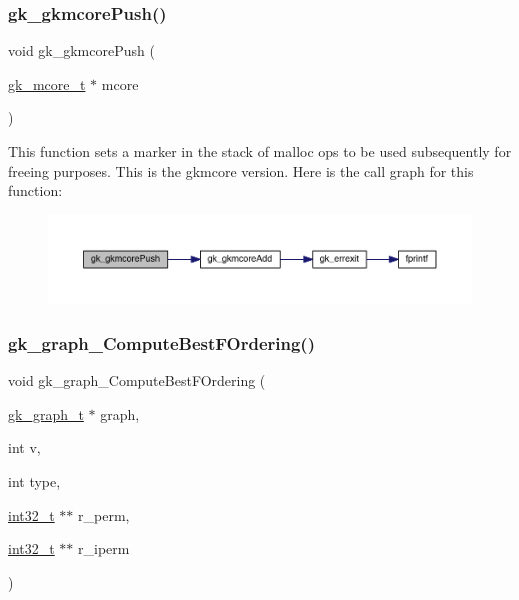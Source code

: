 \subsubsection{\texorpdfstring{gk\+\_\+gkmcore\+Push()}{gk\_gkmcorePush()}}
{\footnotesize\ttfamily void gk\+\_\+gkmcore\+Push (\begin{DoxyParamCaption}\item[{\hyperlink{a00682}{gk\+\_\+mcore\+\_\+t} $\ast$}]{mcore }\end{DoxyParamCaption})}

This function sets a marker in the stack of malloc ops to be used subsequently for freeing purposes. This is the gkmcore version. Here is the call graph for this function\+:\nopagebreak
\begin{figure}[H]
\begin{center}
\leavevmode
\includegraphics[width=350pt]{a00077_a7e52f5d61f36e5c6a9e6634d90dadf2d_cgraph}
\end{center}
\end{figure}
\mbox{\label{a00077_ab06073efcea470e57620d447548b2aca}} 
\subsubsection{\texorpdfstring{gk\+\_\+graph\+\_\+\+Compute\+Best\+F\+Ordering()}{gk\_graph\_ComputeBestFOrdering()}}
{\footnotesize\ttfamily void gk\+\_\+graph\+\_\+\+Compute\+Best\+F\+Ordering (\begin{DoxyParamCaption}\item[{\hyperlink{a00638}{gk\+\_\+graph\+\_\+t} $\ast$}]{graph,  }\item[{int}]{v,  }\item[{int}]{type,  }\item[{\hyperlink{a00119_a37994e3b11c72957c6f454c6ec96d43d}{int32\+\_\+t} $\ast$$\ast$}]{r\+\_\+perm,  }\item[{\hyperlink{a00119_a37994e3b11c72957c6f454c6ec96d43d}{int32\+\_\+t} $\ast$$\ast$}]{r\+\_\+iperm }\end{DoxyParamCaption})}

